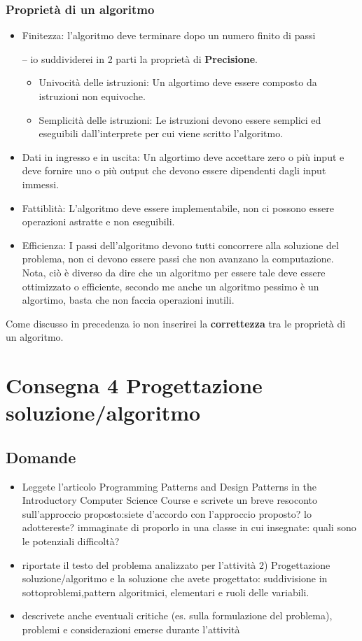 \documentclass[a4paper]{article}
\begin{document}
\subsubsection{Proprietà di un algoritmo}
\begin{itemize}
	\item Finitezza: l'algoritmo deve terminare dopo un numero finito di passi
	\item[--]io suddividerei in 2 parti la proprietà di \textbf{Precisione}.
		\begin{itemize}
	\item Univocità delle istruzioni: Un algortimo deve essere composto da istruzioni non equivoche.
	\item Semplicità delle istruzioni: Le istruzioni devono essere semplici ed eseguibili dall'interprete per cui viene scritto l'algoritmo.
		\end{itemize}
	\item Dati in ingresso e in uscita: Un algortimo deve accettare zero o più input e deve fornire uno o più output che devono essere dipendenti dagli input immessi.
	\item Fattiblità: L'algoritmo deve essere implementabile, non ci possono essere operazioni astratte e non eseguibili.
	\item Efficienza: I passi dell'algoritmo devono tutti concorrere alla soluzione del problema, non ci devono essere passi che non avanzano la computazione.\\
		Nota, ciò è diverso da dire che un algoritmo per essere tale deve essere ottimizzato o efficiente, secondo me anche un algoritmo pessimo è un algortimo, basta che non faccia operazioni inutili.

\end{itemize}
Come discusso in precedenza io non inserirei la \textbf{correttezza} tra le proprietà di un algoritmo.
\section{Consegna 4 \large Progettazione soluzione/algoritmo}

\subsection{Domande}
\begin{itemize}
	\item Leggete l'articolo Programming Patterns and Design Patterns in the Introductory Computer Science Course e scrivete un breve resoconto sull'approccio proposto:siete d'accordo con l'approccio proposto? lo adottereste? immaginate di proporlo in una classe in cui insegnate: quali sono le potenziali difficoltà?
	\item riportate il testo del problema analizzato per l'attività 2) Progettazione soluzione/algoritmo e la soluzione che avete progettato: suddivisione in sottoproblemi,pattern algoritmici, elementari e ruoli delle variabili.
	\item descrivete anche eventuali critiche (es. sulla formulazione del problema), problemi e considerazioni emerse durante l'attività
\end{itemize}
\end{document}
